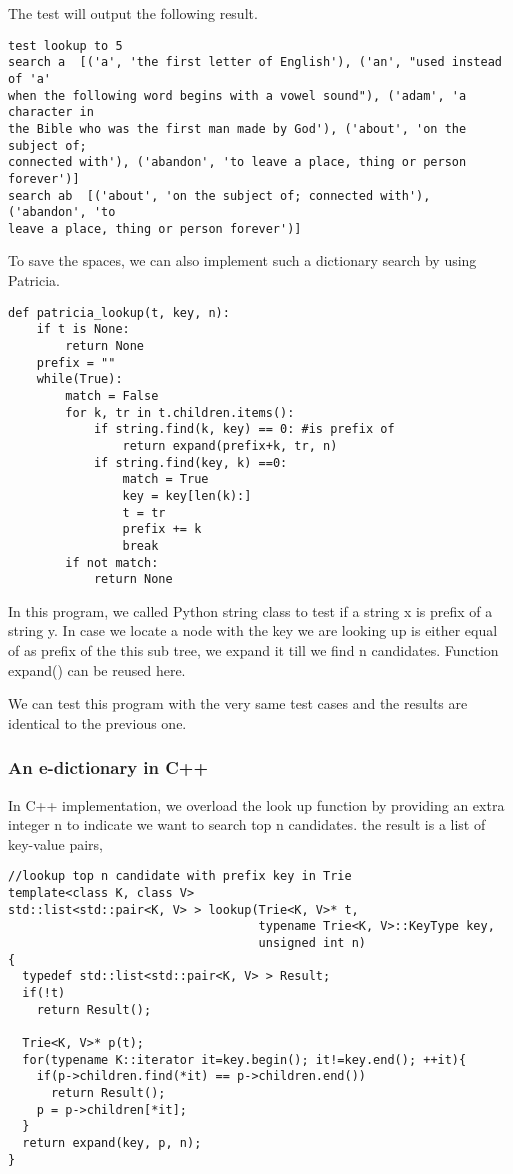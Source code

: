 \documentclass{article}
\begin{document}
The test will output the following result.

\begin{verbatim}
test lookup to 5
search a  [('a', 'the first letter of English'), ('an', "used instead of 'a'
when the following word begins with a vowel sound"), ('adam', 'a character in
the Bible who was the first man made by God'), ('about', 'on the subject of;
connected with'), ('abandon', 'to leave a place, thing or person forever')]
search ab  [('about', 'on the subject of; connected with'), ('abandon', 'to
leave a place, thing or person forever')]
\end{verbatim}

To save the spaces, we can also implement such a dictionary search by using
Patricia.

\begin{lstlisting}
def patricia_lookup(t, key, n):
    if t is None:
        return None
    prefix = ""
    while(True):
        match = False
        for k, tr in t.children.items():
            if string.find(k, key) == 0: #is prefix of
                return expand(prefix+k, tr, n)
            if string.find(key, k) ==0:
                match = True
                key = key[len(k):]
                t = tr
                prefix += k
                break
        if not match:
            return None
\end{lstlisting}

In this program, we called Python string class to test if a string x is
prefix of a string y. In case we locate a node with the key we are looking
up is either equal of as prefix of the this sub tree, we expand it till
we find n candidates. Function expand() can be reused here.

We can test this program with the very same test cases and the results are
identical to the previous one.

\subsubsection*{An e-dictionary in C++}

In C++ implementation, we overload the look up function by providing an
extra integer n to indicate we want to search top n candidates. the
result is a list of key-value pairs,

\lstset{language=C++}
\begin{lstlisting}
//lookup top n candidate with prefix key in Trie
template<class K, class V>
std::list<std::pair<K, V> > lookup(Trie<K, V>* t,
                                   typename Trie<K, V>::KeyType key,
                                   unsigned int n)
{
  typedef std::list<std::pair<K, V> > Result;
  if(!t)
    return Result();

  Trie<K, V>* p(t);
  for(typename K::iterator it=key.begin(); it!=key.end(); ++it){
    if(p->children.find(*it) == p->children.end())
      return Result();
    p = p->children[*it];
  }
  return expand(key, p, n);
}
\end{lstlisting}
\end{document}
